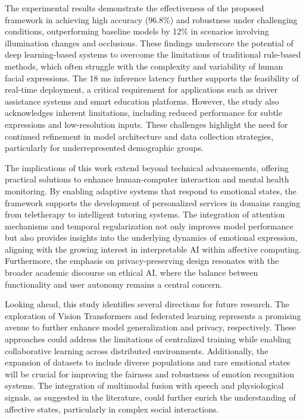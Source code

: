 \documentclass[conference]{IEEEtran}
\begin{document}
The experimental results demonstrate the effectiveness of the proposed framework in achieving high accuracy (96.8\%) and robustness under challenging conditions, outperforming baseline models by 12\% in scenarios involving illumination changes and occlusions. These findings underscore the potential of deep learning-based systems to overcome the limitations of traditional rule-based methods, which often struggle with the complexity and variability of human facial expressions. The 18 ms inference latency further supports the feasibility of real-time deployment, a critical requirement for applications such as driver assistance systems and smart education platforms. However, the study also acknowledges inherent limitations, including reduced performance for subtle expressions and low-resolution inputs. These challenges highlight the need for continued refinement in model architecture and data collection strategies, particularly for underrepresented demographic groups.  

The implications of this work extend beyond technical advancements, offering practical solutions to enhance human-computer interaction and mental health monitoring. By enabling adaptive systems that respond to emotional states, the framework supports the development of personalized services in domains ranging from teletherapy to intelligent tutoring systems. The integration of attention mechanisms and temporal regularization not only improves model performance but also provides insights into the underlying dynamics of emotional expression, aligning with the growing interest in interpretable AI within affective computing. Furthermore, the emphasis on privacy-preserving design resonates with the broader academic discourse on ethical AI, where the balance between functionality and user autonomy remains a central concern.  

Looking ahead, this study identifies several directions for future research. The exploration of Vision Transformers and federated learning represents a promising avenue to further enhance model generalization and privacy, respectively. These approaches could address the limitations of centralized training while enabling collaborative learning across distributed environments. Additionally, the expansion of datasets to include diverse populations and rare emotional states will be crucial for improving the fairness and robustness of emotion recognition systems. The integration of multimodal fusion with speech and physiological signals, as suggested in the literature, could further enrich the understanding of affective states, particularly in complex social interactions.  
\end{document}
